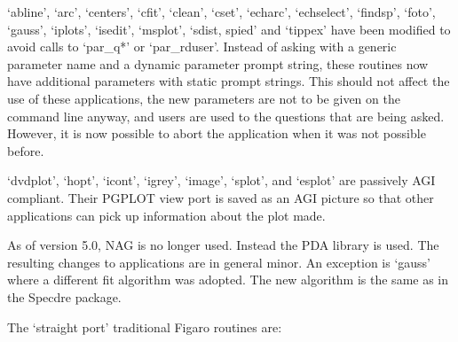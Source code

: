 \documentclass[11pt,twoside]{article}
\begin{document}
   `abline', `arc', `centers', `cfit', `clean', `cset', `echarc',
   `echselect', `findsp', `foto', `gauss', `iplots', `isedit', `msplot',
   `sdist, spied' and `tippex' have been modified to avoid calls to
   `par\_q*' or `par\_rduser'.  Instead of asking with a generic parameter
   name and a dynamic parameter prompt string, these routines now have
   additional parameters with static prompt strings.  This should not
   affect the use of these applications, the new parameters are not to
   be given on the command line anyway, and users are used to the
   questions  that are being asked.  However, it is now possible to
   abort the application when it was not possible before.

   `dvdplot', `hopt', `icont', `igrey', `image', `splot', and `esplot'
   are passively AGI compliant. Their PGPLOT view port is saved as an AGI
   picture so that other applications can pick up information about the
   plot made.

   As of version 5.0, NAG is no longer used. Instead the PDA library is
   used. The resulting changes to applications are in general minor. An
   exception is `gauss' where a different fit algorithm was adopted. The
   new algorithm is the same as in the Specdre package.

   The `straight port' traditional Figaro routines are:
\end{document}
